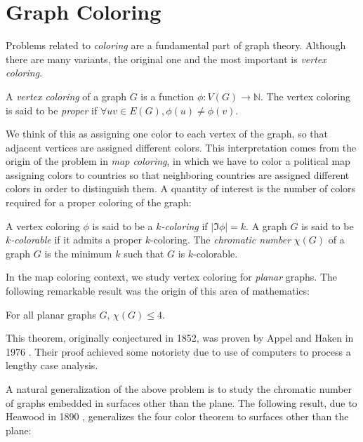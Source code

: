 \section{Graph Coloring}

Problems related to \emph{coloring} are a fundamental part of graph theory. Although there are many variants, the original one and the most important is \emph{vertex coloring}.

\begin{definition}
A \emph{vertex coloring} of a graph $G$ is a function $\phi : V(G) \rightarrow \mathbb{N}$. The vertex coloring is said to be \emph{proper} if $\forall uv \in E(G), \phi(u) \neq \phi(v)$. 
\end{definition}

We think of this as assigning one color to each vertex of the graph, so that adjacent vertices are assigned different colors. This interpretation comes from the origin of the problem in \textit{map coloring}, in which we have to color a political map assigning colors to countries so that neighboring countries are assigned different colors in order to distinguish them. A quantity of interest is the number of colors required for a proper coloring of the graph:

\begin{definition}
A vertex coloring $\phi$ is said to be a $k$\emph{-coloring} if $|\Im \phi| = k$. A graph $G$ is said to be $k$\emph{-colorable} if it admits a proper $k$-coloring. The \emph{chromatic number} $\chi(G)$ of a graph $G$ is the minimum $k$ such that $G$ is $k$-colorable. 
\end{definition}

In the map coloring context, we study vertex coloring for \emph{planar} graphs. The following remarkable result was the origin of this area of mathematics:

\begin{theorem}
For all planar graphs $G$, $\chi(G) \leq 4$.
\end{theorem}

This theorem, originally conjectured in 1852, was proven by Appel and Haken in 1976 \cite{4ct1, 4ct2}. Their proof achieved some notoriety due to use of computers to process a lengthy case analysis. 

A natural generalization of the above problem is to study the chromatic number of graphs embedded in surfaces other than the plane. The following result, due to Heawood in 1890 \cite{heawoodmapcolour}, generalizes the four color theorem to surfaces other than the plane:

